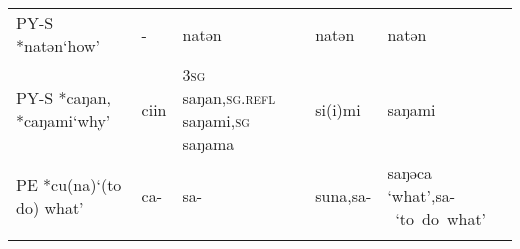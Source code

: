 \begin{table}
\begin{tabularx}{\textwidth}{QQQQQ}
\tablevspace 
PY-S *natən\newline ‘how’ & - & natən & natən & natən\\
\tablevspace 
PY-S *caŋan, *caŋami\newline ‘why’ & ciin & 3\textsc{sg} saŋan,\textsc{sg.refl} saŋami,\textsc{sg} saŋama & si(i)mi & saŋami\\
\tablevspace 
PE *cu(na)\newline ‘(to do) what’ & ca- & sa- & suna,\newline sa- & saŋəca ‘what’,\newline \mbox{sa- ‘to do what’}\\
\lspbottomrule
\end{tabularx}
\end{table}

